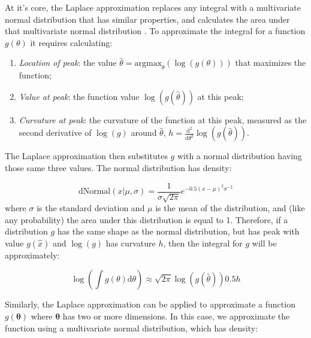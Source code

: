 At it's core, the Laplace approximation replaces any integral with a multivariate normal distribution that has similar properties, and calculates the area under that multivariate normal distribution \cite{skaug_automatic_2006}.  To approximate the integral for a function \(g(\theta)\) it requires calculating:
\begin{enumerate}
    \item \textit{Location of peak}: the value \(\hat{\theta}=\mathrm{argmax}_{\theta} (\log(g(\theta)))\) that maximizes the function;

    \item \textit{Value at peak}: the function value \( \log(g(\hat{\theta})) \) at this peak;

    \item \textit{Curvature at peak}: the curvature of the function at this peak, measured as the second derivative of \(\log(g)\) around \(\hat{\theta}\), \( h = \frac{\mathrm{d}^2}{\mathrm{d}\theta^2} \log(g(\hat{\theta}))\). 
\end{enumerate}
The Laplace approximation then substitutes \(g\) with a normal distribution having those same three values.  The normal distribution has density:

\begin{equation}
    \mathrm{dNormal}( x | \mu, \sigma ) = \frac{1}{\sigma \sqrt{2 \pi}} e^{ -0.5(x-\mu)^2\sigma^{-2} }
\end{equation}
where \( \sigma \) is the standard deviation and \( \mu \) is the mean of the distribution, and (like any probability) the area under this distribution is equal to 1.  Therefore, if a distribution \(g\) has the same shape as the normal distribution, but has peak with value \(g(\hat{x})\) and \(\log(g)\) has curvature \(h\), then the integral for \(g\) will be approximately:

\begin{equation} \label{eq:Chap2_univariate_Laplace}
    \log \left(\int g(\theta) \mathrm{d}\theta \right) \approx \sqrt{2\pi} \log \left( g(\hat{\theta}) \right) 0.5h
\end{equation}

Similarly, the Laplace approximation can be applied to approximate a function \(g(\mathbf{\theta})\) where \(\mathbf{\theta}\) has two or more dimensions.  In this case, we approximate the function using a multivariate normal distribution, which has density:

